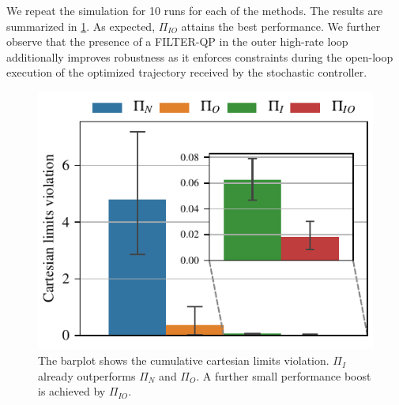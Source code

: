 We repeat the simulation for 10 runs for each of the methods. The results are summarized in \fig \ref{fig:obstacle_avoidance}. As expected, $\Pi_{IO}$ attains the best performance. We further observe that the presence of a FILTER-QP in the outer high-rate loop additionally improves robustness as it enforces constraints during the open-loop execution of the optimized trajectory received by the stochastic controller. 
\begin{figure}[t]
    \centering
    \includegraphics[width=0.7\columnwidth]{figures/obstacle_avoidance/obstacle_avoidance_test.pdf}
    \caption{The barplot shows the cumulative cartesian limits violation. $\Pi_{I}$ already outperforms $\Pi_{N}$ and $\Pi_{O}$. A further small performance boost is achieved by $\Pi_{IO}$.}
    \label{fig:obstacle_avoidance}
\end{figure}

\vspace{0.3cm}
